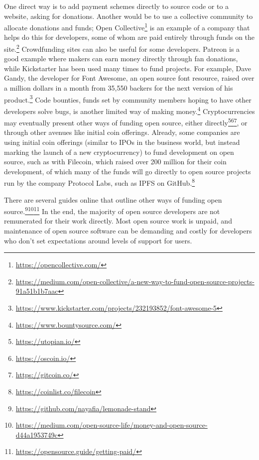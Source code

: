One direct way is to add payment schemes directly to source code or to a website, asking for donations. Another would be to use a collective community to allocate donations and funds; Open Collective\footnote{\href{https://opencollective.com/}{https://opencollective.com/}} is an example of a company that helps do this for developers, some of whom are paid entirely through funds on the site.\footnote{\href{https://medium.com/open-collective/a-new-way-to-fund-open-source-projects-91a51b1b7aac}{https://medium.com/open-collective/a-new-way-to-fund-open-source-projects-91a51b1b7aac}} Crowdfunding sites can also be useful for some developers. Patreon is a good example where makers can earn money directly through fan donations, while Kickstarter has been used many times to fund projects. For example, Dave Gandy, the developer for Font Awesome, an open source font resource, raised over a million dollars in a month from 35,550 backers for the next version of his product.\footnote{\href{https://www.kickstarter.com/projects/232193852/font-awesome-5}{https://www.kickstarter.com/projects/232193852/font-awesome-5}} Code bounties, funds set by community members hoping to have other developers solve bugs, is another limited way of making money.\footnote{\href{https://www.bountysource.com/}{https://www.bountysource.com/}} Cryptocurrencies may eventually present other ways of funding open source, either directly\footnote{\href{https://utopian.io/}{https://utopian.io/}}\footnote{\href{https://oscoin.io/}{https://oscoin.io/}}\footnote{\href{https://gitcoin.co/}{https://gitcoin.co/}}, or through other avenues like initial coin offerings. Already, some companies are using initial coin offerings (similar to IPOs in the business world, but instead marking the launch of a new cryptocurrency) to fund development on open source, such as with Filecoin, which raised over 200 million for their coin development, of which many of the funds will go directly to open source projects run by the company Protocol Labs, such as IPFS \citep{benet2014ipfs} on GitHub.\footnote{\href{https://coinlist.co/filecoin}{https://coinlist.co/filecoin}}

There are several guides online that outline other ways of funding open source.\footnote{\href{https://github.com/nayafia/lemonade-stand}{https://github.com/nayafia/lemonade-stand}}\footnote{\href{https://medium.com/open-source-life/money-and-open-source-d44a1953749c}{https://medium.com/open-source-life/money-and-open-source-d44a1953749c}}\footnote{\href{https://opensource.guide/getting-paid/}{https://opensource.guide/getting-paid/}} In the end, the majority of open source developers are not remunerated for their work directly. Most open source work is unpaid, and maintenance of open source software can be demanding and costly for developers who don't set expectations around levels of support for users.

